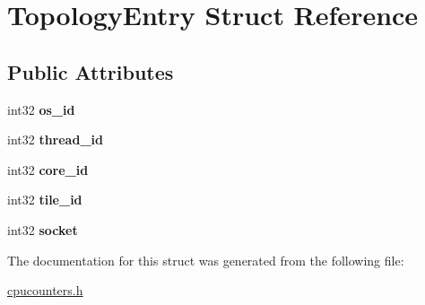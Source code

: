 \hypertarget{struct_topology_entry}{}\section{Topology\+Entry Struct Reference}
\label{struct_topology_entry}
\subsection*{Public Attributes}
\begin{DoxyCompactItemize}
\item 
\mbox{\label{struct_topology_entry_aa960a8bbdd754740d781072ae1266eed}} 
int32 {\bfseries os\+\_\+id}
\item 
\mbox{\label{struct_topology_entry_a1db41da84b81248561c0c0b00739939f}} 
int32 {\bfseries thread\+\_\+id}
\item 
\mbox{\label{struct_topology_entry_aee7bef9e2b54f9617a697a43068a5c27}} 
int32 {\bfseries core\+\_\+id}
\item 
\mbox{\label{struct_topology_entry_a620e9508cdcd78b979ffaabe2581afd1}} 
int32 {\bfseries tile\+\_\+id}
\item 
\mbox{\label{struct_topology_entry_a9b217468c64b3072b48ad5466742827e}} 
int32 {\bfseries socket}
\end{DoxyCompactItemize}


The documentation for this struct was generated from the following file\+:\begin{DoxyCompactItemize}
\item 
\mbox{\hyperlink{cpucounters_8h}{cpucounters.\+h}}\end{DoxyCompactItemize}
